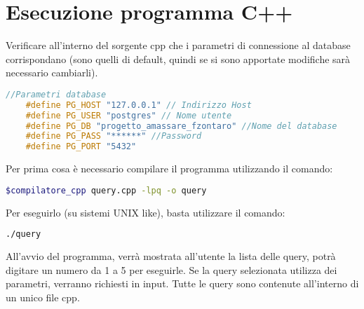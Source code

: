 \section{Esecuzione programma C++}
  Verificare all'interno del sorgente cpp che i parametri di connessione
  al database corrispondano (sono quelli di default, quindi se si sono apportate
  modifiche sarà necessario cambiarli).
  \begin{lstlisting}[language=c++]
    //Parametri database
    #define PG_HOST "127.0.0.1" // Indirizzo Host
    #define PG_USER "postgres" // Nome utente
    #define PG_DB "progetto_amassare_fzontaro" //Nome del database
    #define PG_PASS "******" //Password
    #define PG_PORT "5432"
  \end{lstlisting}

  \noindent
  Per prima cosa è necessario compilare il programma utilizzando il comando:
  
  \begin{lstlisting}[language=bash]
    $compilatore_cpp query.cpp -lpq -o query
  \end{lstlisting}

  \noindent
  Per eseguirlo (su sistemi UNIX like), basta utilizzare il comando:
  \begin{lstlisting}[language=bash]
    ./query
  \end{lstlisting}

  \noindent
  All'avvio del programma, verrà mostrata all'utente la lista delle query, potrà digitare un numero da 1 a 5 per eseguirle. Se la query selezionata utilizza dei parametri, verranno richiesti in input.
  \newline
  Tutte le query sono contenute all'interno di un unico file cpp.
  